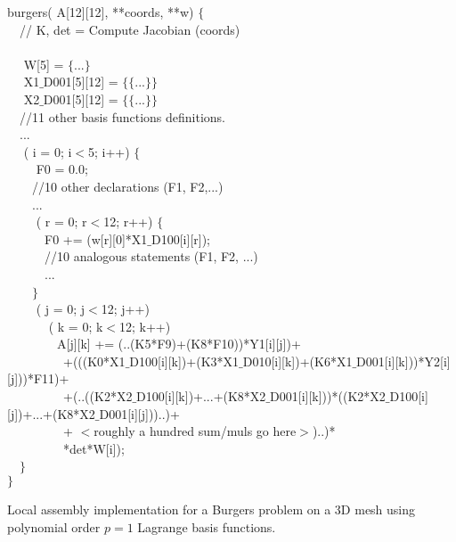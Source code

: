 \begin{algorithm}[t]
\scriptsize
{}

 burgers( A[12][12],  **coords,  **w) $\lbrace$\\
~~// K, det = Compute Jacobian (coords) \\
~~\\
~~ W[5] = $\lbrace$...$\rbrace$\\
~~ X1$\_$D001[5][12] = $\lbrace\lbrace$...$\rbrace\rbrace$\\
~~ X2$\_$D001[5][12] = $\lbrace\lbrace$...$\rbrace\rbrace$\\
~~//11 other basis functions definitions.\\
~~...\\
~~ ( i = 0; i$<$5; i++) $\lbrace$\\
~~~~ F0 = 0.0;\\
~~~~//10 other declarations (F1, F2,...)\\
~~~~...\\
~~~~ ( r = 0; r$<$12; r++) $\lbrace$\\
~~~~~~F0 += (w[r][0]*X1$\_$D100[i][r]);\\
~~~~~~//10 analogous statements (F1, F2, ...)\\
~~~~~~...\\
~~~~$\rbrace$\\
~~~~ ( j = 0; j$<$12; j++) \\
~~~~~~ ( k = 0; k$<$12; k++) \\
~~~~~~~~A[j][k] += (..(K5*F9)+(K8*F10))*Y1[i][j])+\\
~~~~~~~~~+(((K0*X1$\_$D100[i][k])+(K3*X1$\_$D010[i][k])+(K6*X1$\_$D001[i][k]))*Y2[i][j]))*F11)+\\
~~~~~~~~~+(..((K2*X2$\_$D100[i][k])+...+(K8*X2$\_$D001[i][k]))*((K2*X2$\_$D100[i][j])+...+(K8*X2$\_$D001[i][j]))..)+\\
~~~~~~~~~+ $<$roughly a hundred sum/muls go here$>$)..)*\\
~~~~~~~~~*det*W[i]);\\
~~$\rbrace$ \\
$\rbrace$
\caption{Local assembly implementation for a Burgers problem on a 3D mesh using polynomial order $p=1$ Lagrange basis functions.}
\label{code:burgers}
\end{algorithm}

